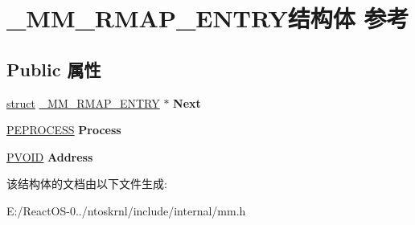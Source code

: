 \hypertarget{struct___m_m___r_m_a_p___e_n_t_r_y}{}\section{\+\_\+\+M\+M\+\_\+\+R\+M\+A\+P\+\_\+\+E\+N\+T\+R\+Y结构体 参考}
\label{struct___m_m___r_m_a_p___e_n_t_r_y}
\subsection*{Public 属性}
\begin{DoxyCompactItemize}
\item 
\mbox{\label{struct___m_m___r_m_a_p___e_n_t_r_y_a6f0ed8fee612ffa041bd1ae9aa1e6973}} 
\hyperlink{interfacestruct}{struct} \hyperlink{struct___m_m___r_m_a_p___e_n_t_r_y}{\+\_\+\+M\+M\+\_\+\+R\+M\+A\+P\+\_\+\+E\+N\+T\+RY} $\ast$ {\bfseries Next}
\item 
\mbox{\label{struct___m_m___r_m_a_p___e_n_t_r_y_a50bf65bcd26c4279aa06dc9057c670e8}} 
\hyperlink{struct___e_p_r_o_c_e_s_s}{P\+E\+P\+R\+O\+C\+E\+SS} {\bfseries Process}
\item 
\mbox{\label{struct___m_m___r_m_a_p___e_n_t_r_y_a00e8061aba68215e528a87bf5854e0cc}} 
\hyperlink{interfacevoid}{P\+V\+O\+ID} {\bfseries Address}
\end{DoxyCompactItemize}


该结构体的文档由以下文件生成\+:\begin{DoxyCompactItemize}
\item 
E\+:/\+React\+O\+S-\/0../ntoskrnl/include/internal/mm.\+h\end{DoxyCompactItemize}
